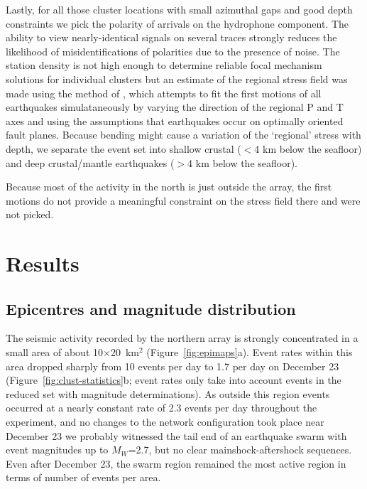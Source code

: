 \documentclass[reviewcopy]{elsarticle}
\begin{document}
Lastly, for all those cluster locations
with small azimuthal
gaps and good depth constraints we pick the polarity of arrivals on the hydrophone
component. The ability to view nearly-identical signals on several
traces strongly reduces the likelihood of misidentifications of
polarities due to the presence of noise. The station density is not
high enough to determine reliable focal mechanism solutions for
individual clusters but an estimate of the regional stress field was
made using the method of \citet{robinson00}, which attempts to fit the
first motions of all earthquakes simulataneously by varying the
direction of the regional P and T axes and using the assumptions that earthquakes
occur on optimally oriented fault planes.  Because bending might cause
a variation of the `regional' stress with depth, we separate the event set
into shallow crustal ($<$4 km below the seafloor) and deep
crustal/mantle earthquakes ($>$4 km below the seafloor).

Because most of the activity in the north is just outside the array,
the first motions do not provide a meaningful constraint on the
stress field there and were not picked.

\section{Results}

\subsection{Epicentres and magnitude distribution}

The seismic activity recorded by the northern array is strongly
concentrated in a small area of about 10$\times$20~km$^2$
(Figure~\ref{fig:epimaps}a).  Event
rates within this area dropped sharply from 10 events per day to 1.7 per
day on December
23 (Figure~\ref{fig:clust-statistics}b; event rates only take into account events in the reduced set with
magnitude
determinations).  As outside this region events occurred at  a nearly constant rate of
2.3 events per day throughout the experiment, and no  changes to the network configuration took
place near December 23 we probably witnessed the tail end of an
earthquake swarm with event magnitudes up to $M_W$=2.7, but no clear
mainshock-aftershock sequences.   Even after December 23, the swarm
region remained the most active region in terms of number of events per
area.
\end{document}
